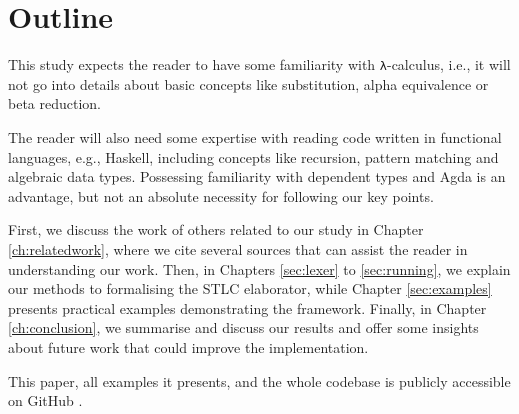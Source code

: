 \chapter{Outline}
\label{ch:outline}

This study expects the reader to have some familiarity with \verb$λ$-calculus, i.e., it will not go into details about basic concepts like substitution, alpha equivalence or beta reduction.

The reader will also need some expertise with reading code written in functional languages, e.g., Haskell, including concepts like recursion, pattern matching and algebraic data types. Possessing familiarity with dependent types and Agda is an advantage, but not an absolute necessity for following our key points.

First, we discuss the work of others related to our study in Chapter \ref{ch:relatedwork}, where we cite several sources that can assist the reader in understanding our work. Then, in Chapters \ref{sec:lexer} to \ref{sec:running}, we explain our methods to formalising the STLC elaborator, while Chapter \ref{sec:examples} presents practical examples demonstrating the framework. Finally, in Chapter \ref{ch:conclusion}, we summarise and discuss our results and offer some insights about future work that could improve the implementation.

This paper, all examples it presents, and the whole codebase is publicly accessible on GitHub \cite{home-repo}.

